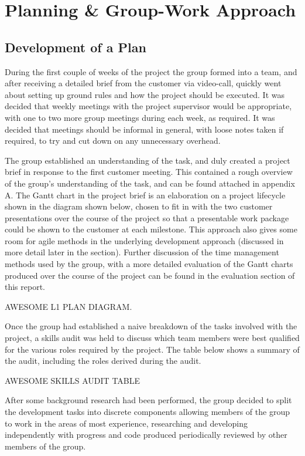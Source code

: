 \section{Planning \& Group-Work Approach}

\subsection{Development of a Plan}

During the first couple of weeks of the project the group formed into a team,
and after receiving a detailed brief from the customer via video-call, quickly
went about setting up ground rules and how the project should be executed. It
was decided that weekly meetings with the project supervisor would be
appropriate, with one to two more group meetings during each week, as required.
It was decided that meetings should be informal in general, with loose notes
taken if required, to try and cut down on any unnecessary overhead.

The group established an understanding of the task, and duly created a project
brief in response to the first customer meeting. This contained a rough overview
of the group's understanding of the task, and can be found attached in appendix
A. The Gantt chart in the project brief is an elaboration on a project lifecycle
shown in the diagram shown below, chosen to fit in with the two customer
presentations over the course of the project so that a presentable work package
could be shown to the customer at each milestone. This approach also gives some
room for agile methods in the underlying development approach (discussed in
more detail later in the section). Further discussion of the time management
methods used by the group, with a more detailed evaluation of the Gantt charts
produced over the course of the project can be found in the evaluation section
of this report.

AWESOME L1 PLAN DIAGRAM.

Once the group had established a naive breakdown of the tasks involved with the
project, a skills audit was held to discuss which team members were best
qualified for the various roles required by the project. The table below shows
a summary of the audit, including the roles derived during the audit.

AWESOME SKILLS AUDIT TABLE

After some background research had been performed, the group decided to split
the development tasks into discrete components allowing members of the group to
work in the areas of most experience, researching and developing independently
with progress and code produced periodically reviewed by other members of the
group.

